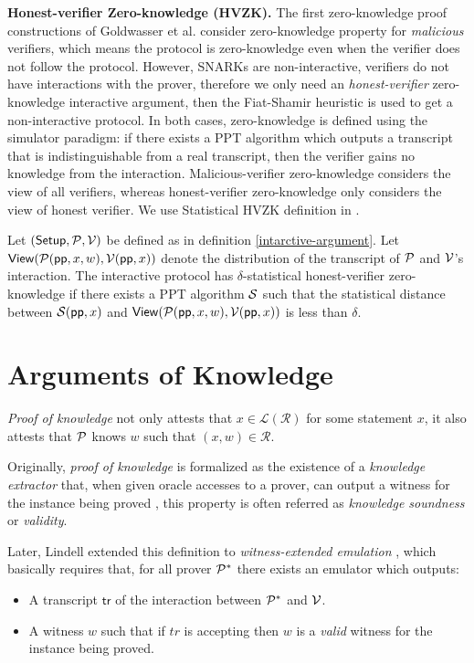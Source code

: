 \textbf{Honest-verifier Zero-knowledge (HVZK).} The first zero-knowledge proof constructions of Goldwasser et al. \cite{goldreich1986prove} consider zero-knowledge property for \textit{malicious} verifiers, which means the protocol is zero-knowledge even when the verifier does not follow the protocol. However, SNARKs are non-interactive, verifiers do not have interactions with the prover, therefore we only need an \textit{honest-verifier} zero-knowledge interactive argument, then the Fiat-Shamir heuristic is used to get a non-interactive protocol. In both cases, zero-knowledge is defined using the simulator paradigm: if there exists a PPT algorithm which outputs a transcript that is indistinguishable from a real transcript, then the verifier gains no knowledge from the interaction. Malicious-verifier zero-knowledge considers the view of all verifiers, whereas honest-verifier zero-knowledge only considers the view of honest verifier. We use Statistical HVZK definition in \cite{bunz2020transparent}.

\begin{definition}
Let $(\mathsf{Setup}, \mathcal{P}, \mathcal{V})$ be defined as in definition \ref{intarctive-argument}.
Let $\mathsf{View}(\mathcal{P}(\mathsf{pp}, x, w), \mathcal{V}(\mathsf{pp}, x))$ denote the distribution of the transcript of $\mathcal{P}$ and $\mathcal{V}$'s interaction. The interactive protocol has $\delta$-statistical honest-verifier zero-knowledge if there exists a PPT algorithm $\mathcal{S}$ such that the statistical distance between $\mathcal{S}(\mathsf{pp}, x)$ and $\mathsf{View}(\mathcal{P}(\mathsf{pp}, x, w), \mathcal{V}(\mathsf{pp}, x))$ is less than $\delta$.
\end{definition}

\section{Arguments of Knowledge}

\textit{Proof of knowledge} not only attests that $x \in \mathcal{L(R)}$ for some statement $x$, it also attests that $\mathcal{P}$ knows $w$ such that $(x, w) \in \mathcal{R}$.

Originally, \textit{proof of knowledge} is formalized as the existence of a \textit{knowledge extractor} that, when given oracle accesses to a prover, can output a witness for the instance being proved \cite{bellare1992defining}, this property is often referred as \textit{knowledge soundness} or \textit{validity}.

Later, Lindell extended this definition to \textit{witness-extended emulation} \cite{lindell2003parallel}, which basically requires that, for all prover $\mathcal{P}^*$ there exists an emulator which outputs:
\begin{itemize}
    \item A transcript $\mathsf{tr}$ of the interaction between $\mathcal{P}^*$ and $\mathcal{V}$.
    \item A witness $w$ such that if $tr$ is accepting then $w$ is a \textit{valid} witness for the instance being proved.
\end{itemize}


